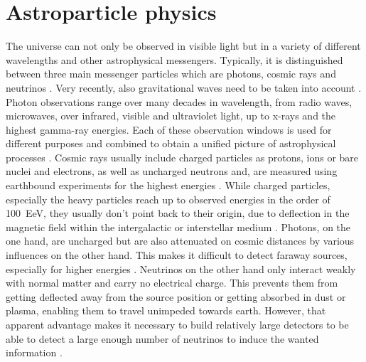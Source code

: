 \chapter{Astroparticle physics}

The universe can not only be observed in visible light but in a variety of different wavelengths and other astrophysical messengers.
Typically, it is distinguished between three main messenger particles which are photons, cosmic rays and neutrinos .
Very recently, also gravitational waves need to be taken into account .
Photon observations range over many decades in wavelength, from radio waves, microwaves, over infrared, visible and ultraviolet light, up to x-rays and the highest gamma-ray energies.
Each of these observation windows is used for different purposes and combined to obtain a unified picture of astrophysical processes .
Cosmic rays usually include charged particles as protons, ions or bare nuclei and electrons, as well as uncharged neutrons and,  are measured using earthbound experiments for the highest energies .
While charged particles, especially the heavy particles reach up to observed energies in the order of \SI{100}{\exa\eV}, they usually don't point back to their origin, due to deflection in the magnetic field within the intergalactic or interstellar medium .
Photons, on the one hand, are uncharged but are also attenuated on cosmic distances by various influences on the other hand.
This makes it difficult to detect faraway sources, especially for higher energies .
Neutrinos on the other hand only interact weakly with normal matter and carry no electrical charge.
This prevents them from getting deflected away from the source position or getting absorbed in dust or plasma, enabling them to travel unimpeded towards earth.
However, that apparent advantage makes it necessary to build relatively large detectors to be able to detect a large enough number of neutrinos to induce the wanted information .

